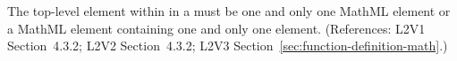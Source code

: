 The top-level element within  in a \FunctionDefinition must be
one and only one MathML  element or a MathML
 element containing one and only one 
element.  (References: L2V1 Section~4.3.2; L2V2 Section~4.3.2;
L2V3 Section~\ref{sec:function-definition-math}.)
